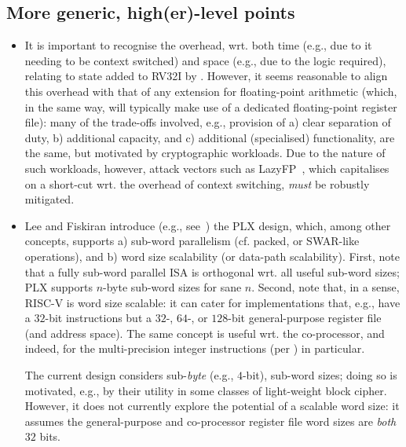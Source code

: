 
\subsection{More  generic, high(er)-level points}
\label{appx:discuss:hi}

\begin{itemize}

\item It is important to recognise 
      the overhead, wrt. both 
      time (e.g., due to it needing to be context switched) 
      and 
      space (e.g., due to the logic required),
      relating to state added to RV32I by \XCID.
      However, it seems reasonable to align this overhead with that of any
      extension for floating-point arithmetic (which, in the same way, will
      typically make use of a dedicated floating-point register file): many 
      of the trade-offs involved, e.g., provision of
      a) clear separation of duty,
      b) additional capacity,
         and
      c) additional (specialised) functionality,
      are the same, but motivated by cryptographic workloads.
      Due to the nature of such workloads, however, attack vectors such as
      LazyFP~\cite{SCARV:StePre:18}, which capitalises on a short-cut wrt. 
      the overhead of context switching, {\em must} be robustly mitigated.

\item Lee and Fiskiran introduce (e.g., see~\cite{SCARV:LeeFis:05}) the PLX
      design, which, among other concepts, supports 
      a) sub-word parallelism (cf. packed, or SWAR-like operations),
         and
      b) word size scalability (or data-path scalability).
      First, 
      note that a fully sub-word parallel ISA is orthogonal wrt. all useful
      sub-word sizes; PLX supports $n$-byte sub-word sizes for sane $n$.
      Second,
      note that, in a sense, RISC-V is word size scalable: it can cater for
      implementations that, e.g., have a $32$-bit instructions but a $32$-,
      $64$-, or $128$-bit general-purpose register file (and address space).
      The same concept is useful wrt. the co-processor, and indeed, for the
      multi-precision integer instructions 
      (per )
      in particular.

      The current design considers sub-{\em byte} (e.g., $4$-bit), sub-word
      sizes; doing so is motivated, e.g., by their utility in some classes 
      of light-weight block cipher.  However, it does not currently explore 
      the potential of a scalable word size: it assumes the general-purpose
      and co-processor register file word sizes are {\em both} $32$ bits.


\end{itemize}
